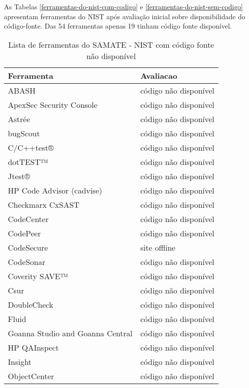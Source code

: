 \documentclass[12pt]{article}
\begin{document}
As Tabelas \ref{ferramentas-do-nist-com-codigo} e
\ref{ferramentas-do-nist-sem-codigo} apresentam ferramentas do NIST após
avaliação inicial sobre disponibilidade do código-fonte. Das 54 ferramentas
apenas 19 tinham código fonte disponível.


\begin{table}
\caption{Lista de ferramentas do SAMATE - NIST com código fonte não disponível}
\centering
\begin{tabular}{| l | l |}
\hline
Ferramenta & Avaliacao  \\
\hline
ABASH                     & código não disponível \\
ApexSec Security Console  & código não disponível \\
Astrée                    & código não disponível \\
bugScout                  & código não disponível \\
C/C++test®                & código não disponível \\
dotTEST™                  & código não disponível \\
Jtest®                    & código não disponível \\
HP Code Advisor (cadvise) & código não disponível \\
Checkmarx CxSAST          & código não disponível \\
CodeCenter                & código não disponível \\
CodePeer                  & código não disponível \\
CodeSecure                & site offline \\
CodeSonar                 & código não disponível \\
Coverity SAVE™            & código não disponível \\
Csur                      & código não disponível \\
DoubleCheck               & código não disponível \\
Fluid                     & código não disponível \\
Goanna Studio and Goanna Central & código não disponível \\
HP QAInspect              & código não disponível \\
Insight                   & código não disponível \\
ObjectCenter              & código não disponível \\

\end{tabular}
\end{table}
\end{document}
